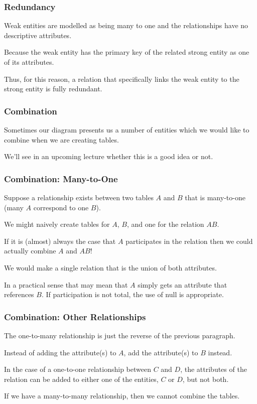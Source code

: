 \begin{frame}
\frametitle{Redundancy}

Weak entities are modelled as being many to one and the relationships have no descriptive attributes. 

Because the weak entity has the primary key of the related strong entity as one of its attributes.

Thus, for this reason, a relation that specifically links the weak entity to the strong entity is fully redundant. 

\end{frame}



\begin{frame}
\frametitle{Combination}

Sometimes our diagram presents us a number of entities which we would like to combine when we are creating tables.

We'll see in an upcoming lecture whether this is a good idea or not.

\end{frame}



\begin{frame}
\frametitle{Combination: Many-to-One}

Suppose a relationship exists between two tables $A$ and $B$ that is many-to-one (many $A$ correspond to one $B$).

We might naively create tables for $A$, $B$, and one for the relation $AB$. 

If it is (almost) always the case that $A$ participates in the relation then we could actually combine $A$ and $AB$! 

We would  make a single relation that is the union of both attributes. 

In a practical sense that may mean that $A$ simply gets an attribute that references $B$.  If participation is not total, the use of null is appropriate.

\end{frame}



\begin{frame}
\frametitle{Combination: Other Relationships}

The one-to-many relationship is just the reverse of the previous paragraph.

Instead of adding the attribute(s) to $A$, add the attribute(s) to $B$ instead. 

In the case of a one-to-one relationship between $C$ and $D$, the attributes of the relation can be added to either one of the entities, $C$ or $D$, but not both.

If we have a many-to-many relationship, then we cannot combine the tables. 

\end{frame}



